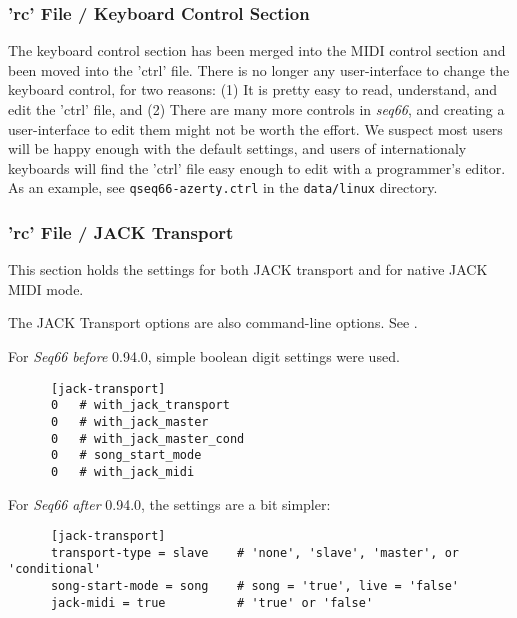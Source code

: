 \subsubsection{'rc' File / Keyboard Control Section}
\label{subsubsec:configuration_rc_keyboard_control}

   The keyboard control section has been merged into the MIDI control section
   and been moved into the 'ctrl' file.
   There is no longer any user-interface to change the
   keyboard control, for two reasons:
   (1) It is pretty easy to read, understand, and edit the 'ctrl' file, and
   (2) There are many more controls in \textsl{seq66}, and creating a
   user-interface to edit them might not be worth the effort.
   We suspect most users will be happy enough with the default settings,
   and users of internationaly keyboards will find the 'ctrl' file easy enough
   to edit with a programmer's editor.  As an example,
   see \texttt{qseq66-azerty.ctrl} in the \texttt{data/linux}
   directory.
        
\subsubsection{'rc' File / JACK Transport}
\label{subsubsec:configuration_rc_jack_transport}

   This section holds the settings for both JACK transport and for native JACK
   MIDI mode.

   The JACK Transport options are also command-line options.
   See .

   For \textsl{Seq66} \textsl{before} 0.94.0, simple boolean digit settings
   were used.

   \begin{verbatim}
      [jack-transport]
      0   # with_jack_transport
      0   # with_jack_master
      0   # with_jack_master_cond
      0   # song_start_mode
      0   # with_jack_midi
   \end{verbatim}

   For \textsl{Seq66} \textsl{after} 0.94.0, the settings are a bit simpler:

   \begin{verbatim}
      [jack-transport]
      transport-type = slave    # 'none', 'slave', 'master', or 'conditional'
      song-start-mode = song    # song = 'true', live = 'false'
      jack-midi = true          # 'true' or 'false'
   \end{verbatim}

